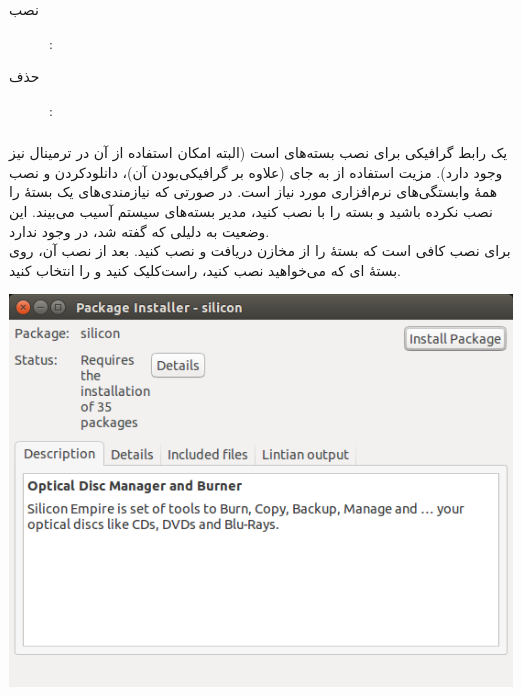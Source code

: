 \begin{description}
\item[نصب]: 
\item[حذف]: 
\end{description}

\subsubsection[gdebi]{}
 یک رابط گرافیکی برای نصب بسته‌های  است (البته امکان استفاده از آن در ترمینال نیز وجود دارد). مزیت استفاده از  به جای  (علاوه بر گرافیکی‌بودن آن)، دانلودکردن و نصب همهٔ وابستگی‌های نرم‌افزاری مورد نیاز است. در صورتی که نیازمندی‌های یک بستهٔ  را نصب نکرده باشید و بسته را با  نصب کنید، مدیر بسته‌های سیستم آسیب می‌بیند. این وضعیت به دلیلی که گفته شد، در  وجود ندارد.\\
برای نصب  کافی است که بستهٔ  را از مخازن دریافت و نصب کنید. بعد از نصب آن، روی بستهٔ  ای که می‌خواهید نصب کنید، راست‌کلیک کنید و  را انتخاب کنید.

\begin{center}
\includegraphics[scale=0.5]{pics/39.png}
\end{center}
